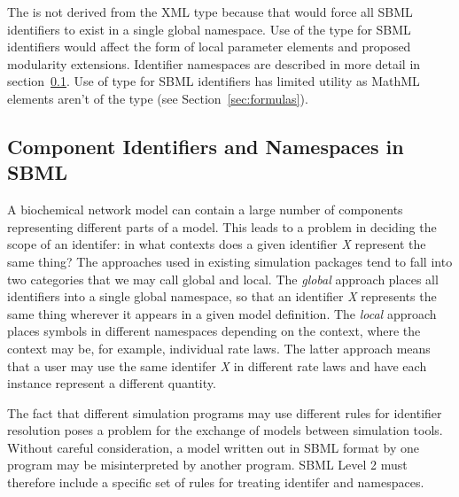 \documentclass[10pt]{cekarticle}
\begin{document}
The  is not derived from the XML  type
because that would force all SBML identifiers to exist in a single
global namespace.  Use of the  type for SBML identifiers
would affect the form of local parameter elements and proposed
modularity extensions.  Identifier namespaces are described in
more detail in section~\ref{sec:namespaces}.  Use of 
type for SBML identifiers has limited utility as MathML 
elements aren't of the type  (see
Section~\ref{sec:formulas}).


\subsection{Component Identifiers and Namespaces in SBML}
\label{sec:namespaces}

A biochemical network model can contain a large number of
components representing different parts of a model.  This leads to
a problem in deciding the scope of an identifer: in what contexts
does a given identifier \emph{X} represent the same thing?  The
approaches used in existing simulation packages tend to fall into
two categories that we may call global and local.  The
\emph{global} approach places all identifiers into a single global
namespace, so that an identifier \emph{X} represents the same thing
wherever it appears in a given model definition.  The \emph{local}
approach places symbols in different namespaces depending on the
context, where the context may be, for example, individual rate
laws.  The latter approach means that a user may use the same
identifer \emph{X} in different rate laws and have each instance
represent a different quantity.

The fact that different simulation programs may use different
rules for identifier resolution poses a problem for the exchange
of models between simulation tools.  Without careful
consideration, a model written out in SBML format by one program
may be misinterpreted by another program.  SBML Level 2 must
therefore include a specific set of rules for treating identifer
and namespaces.
\end{document}

